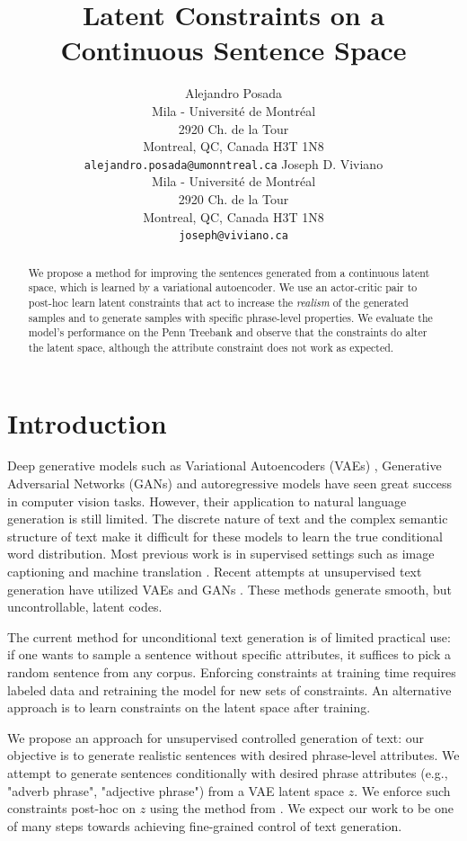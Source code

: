 \documentclass[11pt,letterpaper]{article}
\title{Latent Constraints on a Continuous Sentence Space}
\author{Alejandro Posada \\
	    Mila - Université de Montréal\\
	    2920 Ch. de la Tour\\
        Montreal, QC, Canada H3T 1N8 \\
        {\tt alejandro.posada@umonntreal.ca}
	  \And
	Joseph D. Viviano\\
  	Mila - Université de Montréal\\
  	2920 Ch. de la Tour\\
  	Montreal, QC, Canada H3T 1N8 \\
  {\tt joseph@viviano.ca}}
\date{}
\begin{document}
\maketitle

\begin{abstract}
We propose a method for improving the sentences generated from a continuous latent space, which is learned by a variational autoencoder. We use an actor-critic pair to  post-hoc learn latent constraints that act to increase the \textit{realism} of the generated samples and to generate samples with specific phrase-level properties. We evaluate the model's performance on the Penn Treebank and observe that the constraints do alter the latent space, although the attribute constraint does not work as expected.
\end{abstract}

\section{Introduction}
Deep generative models such as Variational Autoencoders (VAEs) \cite{kingma2013auto,rezende2014stochastic}, Generative Adversarial Networks (GANs) \cite{goodfellow2014generative} and autoregressive models \cite{oord2016pixel} have seen great success in computer vision tasks. However, their application to natural language generation is still limited. The discrete nature of text and the complex semantic structure of text make it difficult for these models to learn the true conditional word distribution. Most previous work is in supervised settings such as image captioning \cite{vinyals2015show} and machine translation \cite{bahdanau2014neural}. Recent attempts at unsupervised text generation have utilized VAEs \cite{bowman2015generating} and GANs \cite{yu2017seqgan,zhang2016generating}. These methods generate smooth, but uncontrollable, latent codes.

The current method for unconditional text generation is of limited practical use: if one wants to sample a sentence without specific attributes, it suffices to pick a random sentence from any corpus. Enforcing constraints at training time requires labeled data and retraining the model for new sets of constraints. An alternative approach is to learn constraints on the latent space after training.

We propose an approach for unsupervised controlled generation of text: our objective is to generate realistic sentences with desired phrase-level attributes. We attempt to generate sentences conditionally with desired phrase attributes (e.g., "adverb phrase", "adjective phrase") from a VAE latent space $z$. We enforce such constraints post-hoc on $z$ using the method from \cite{engel2017latent}. We expect our work to be one of many steps towards achieving fine-grained control of text generation.
\end{document}
